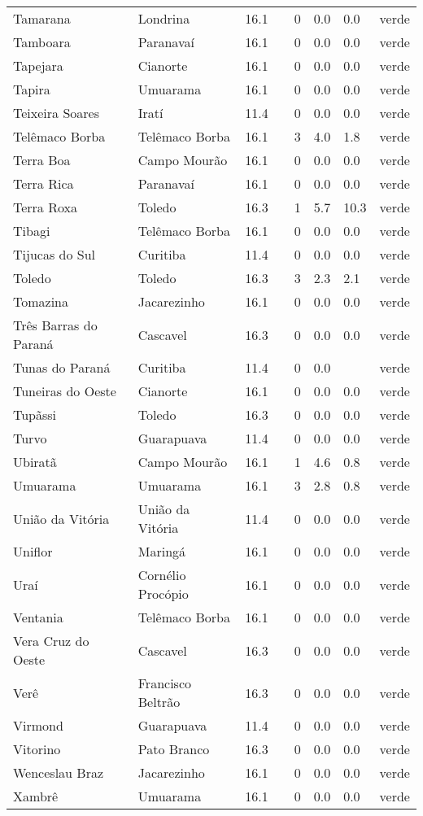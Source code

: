 \begin{longtable}{l|lllllll}
  Tamarana & Londrina & 16.1 &  & 0 & 0.0 & 0.0 & verde \\ 
  Tamboara & Paranavaí & 16.1 &  & 0 & 0.0 & 0.0 & verde \\ 
  Tapejara & Cianorte & 16.1 &  & 0 & 0.0 & 0.0 & verde \\ 
  Tapira & Umuarama & 16.1 &  & 0 & 0.0 & 0.0 & verde \\ 
  Teixeira Soares & Iratí & 11.4 &  & 0 & 0.0 & 0.0 & verde \\ 
  Telêmaco Borba & Telêmaco Borba & 16.1 &  & 3 & 4.0 & 1.8 & verde \\ 
  Terra Boa & Campo Mourão & 16.1 &  & 0 & 0.0 & 0.0 & verde \\ 
  Terra Rica & Paranavaí & 16.1 &  & 0 & 0.0 & 0.0 & verde \\ 
  Terra Roxa & Toledo & 16.3 &  & 1 & 5.7 & 10.3 & verde \\ 
  Tibagi & Telêmaco Borba & 16.1 &  & 0 & 0.0 & 0.0 & verde \\ 
  Tijucas do Sul & Curitiba & 11.4 &  & 0 & 0.0 & 0.0 & verde \\ 
  Toledo & Toledo & 16.3 &  & 3 & 2.3 & 2.1 & verde \\ 
  Tomazina & Jacarezinho & 16.1 &  & 0 & 0.0 & 0.0 & verde \\ 
  Três Barras do Paraná & Cascavel & 16.3 &  & 0 & 0.0 & 0.0 & verde \\ 
  Tunas do Paraná & Curitiba & 11.4 &  & 0 & 0.0 &  & verde \\ 
  Tuneiras do Oeste & Cianorte & 16.1 &  & 0 & 0.0 & 0.0 & verde \\ 
  Tupãssi & Toledo & 16.3 &  & 0 & 0.0 & 0.0 & verde \\ 
  Turvo & Guarapuava & 11.4 &  & 0 & 0.0 & 0.0 & verde \\ 
  Ubiratã & Campo Mourão & 16.1 &  & 1 & 4.6 & 0.8 & verde \\ 
  Umuarama & Umuarama & 16.1 &  & 3 & 2.8 & 0.8 & verde \\ 
  União da Vitória & União da Vitória & 11.4 &  & 0 & 0.0 & 0.0 & verde \\ 
  Uniflor & Maringá & 16.1 &  & 0 & 0.0 & 0.0 & verde \\ 
  Uraí & Cornélio Procópio & 16.1 &  & 0 & 0.0 & 0.0 & verde \\ 
  Ventania & Telêmaco Borba & 16.1 &  & 0 & 0.0 & 0.0 & verde \\ 
  Vera Cruz do Oeste & Cascavel & 16.3 &  & 0 & 0.0 & 0.0 & verde \\ 
  Verê & Francisco Beltrão & 16.3 &  & 0 & 0.0 & 0.0 & verde \\ 
  Virmond & Guarapuava & 11.4 &  & 0 & 0.0 & 0.0 & verde \\ 
  Vitorino & Pato Branco & 16.3 &  & 0 & 0.0 & 0.0 & verde \\ 
  Wenceslau Braz & Jacarezinho & 16.1 &  & 0 & 0.0 & 0.0 & verde \\ 
  Xambrê & Umuarama & 16.1 &  & 0 & 0.0 & 0.0 & verde \\ 
  \hline
\end{longtable}

